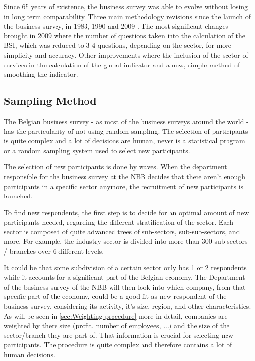 \documentclass[12pt,a4paper,oneside]{book}
\begin{document}
Since 65 years of existence, the business survey was able to evolve without losing in long term comparability.
Three main methodology revisions since the launch of the business survey, in 1983, 1990 and 2009 \cite{de_greef_national_2009}.
The most significant changes brought in 2009 where the number of questions taken into the calculation of the BSI, which was reduced to 3-4 questions, depending on the sector, for more simplicity and accuracy.
Other improvements where the inclusion of the sector of services in the calculation of the global indicator and a new, simple method of smoothing the indicator.

\subsection{Sampling Method}
\label{sec:Recruitment of participants}

The Belgian business survey - as most of the business surveys around the world - has the particularity of not using random sampling. 
The selection of participants is quite complex and a lot of decisions are human, never is a statistical program or a random sampling system used to select new participants.

The selection of new participants is done by waves. When the department responsible for the business survey at the NBB decides that there aren't enough participants in a specific sector anymore, the recruitment of new participants is launched.

To find new respondents, the first step is to decide for an optimal amount of new participants needed, regarding the different stratification of the sector.
Each sector is composed of quite advanced trees of sub-sectors, sub-sub-sectors,  and more. For example, the industry sector is divided into more than 300 sub-sectors / branches over 6 different levels. 

It could be that some subdivision of a certain sector only has 1 or 2 respondents while it accounts for a significant part of the Belgian economy. The Department of the business survey of the NBB will then look into which company, from that specific part of the economy, could be a good fit as new respondent of the business survey, considering its activity, it's size, region, and other characteristics.
As will be seen in \autoref{sec:Weighting procedure} more in detail, companies are weighted by there size (profit, number of employees, ...) and the size of the sector/branch they are part of. That information is crucial for selecting new participants.
The procedure is quite complex and therefore contains a lot of human decisions.
 
\end{document}

